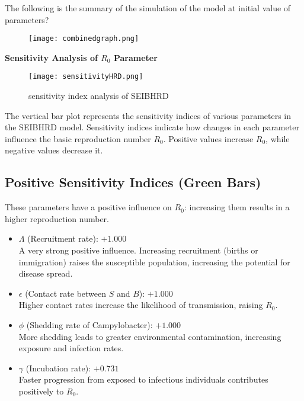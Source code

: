 \documentclass[a4paper,12pt]{report}
\begin{document}
\begin{itemize}
The following is the summary of the simulation of the model at initial value of parameters?
\begin{figure}[H]
    \centering
    \texttt{[image: combinedgraph.png]}
    \label{fig:enter-label}
\end{figure}

\textbf{Sensitivity Analysis of $R_0$ Parameter}

\begin{figure}[H]
    \centering
    \texttt{[image: sensitivityHRD.png]}
    \caption{sensitivity index analysis of SEIBHRD}
    \label{fig:enter-label}
\end{figure}

The vertical bar plot represents the sensitivity indices of various parameters in the SEIBHRD model. Sensitivity indices indicate how changes in each parameter influence the basic reproduction number \( R_0 \). Positive values increase \( R_0 \), while negative values decrease it.

\subsection*{Positive Sensitivity Indices (Green Bars)}
These parameters have a positive influence on \( R_0 \): increasing them results in a higher reproduction number.
\begin{itemize}label=--
    \item \(\Lambda\) (Recruitment rate): \(+1.000\) \\
    A very strong positive influence. Increasing recruitment (births or immigration) raises the susceptible population, increasing the potential for disease spread.
    
    \item \(\epsilon\) (Contact rate between \(S\) and \(B\)): \(+1.000\) \\
    Higher contact rates increase the likelihood of transmission, raising \( R_0 \).
    
    \item \(\phi\) (Shedding rate of Campylobacter): \(+1.000\) \\
    More shedding leads to greater environmental contamination, increasing exposure and infection rates.
    
    \item \(\gamma\) (Incubation rate): \(+0.731\) \\
    Faster progression from exposed to infectious individuals contributes positively to \( R_0 \).
\end{itemize}


\end{itemize}
\end{document}
